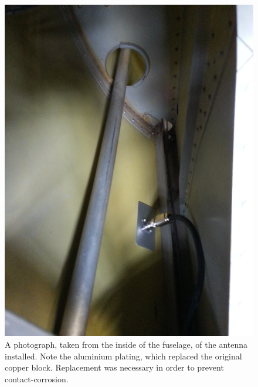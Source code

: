 \documentclass{article}
\begin{document}
\begin{figure}
\includegraphics[width=\textwidth,keepaspectratio]{inside}
\caption{A photograph, taken from the inside of the fuselage, of the antenna installed. Note the aluminium plating, which replaced the original copper block. Replacement was necessary in order to prevent contact-corrosion.}
\label{fig:outside}
\end{figure}
\end{document}
